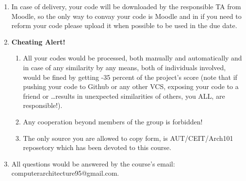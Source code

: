 \documentclass{report}
\begin{document}
\begin{enumerate}
	\item
		In case of delivery, your code will be downloaded by the responsible TA from Moodle, so the only way to convay your code is Moodle and in if you need to reform your code please upload it when possible to be used in the due date.
	\item
		\textbf{Cheating Alert!}
		\begin{enumerate}
			\item
				All your codes would be processed, both manually and automatically and in case of any similarity by any means, both of individuals involved, would be fined by getting -35 percent of the project's score (note that if pushing your code to Github or any other VCS, exposing your code to a friend or \ldots results in unexpected similarities of others, you ALL, are responsible!).
			\item
				Any cooperation beyond members of the group is forbidden!
			\item
				The only source you are allowed to copy form, is AUT/CEIT/Arch101 reposetory which has been devoted to this course.
		\end{enumerate}
	\item All questions would be answered by the course's email: computerarchitecture95@gmail.com.
\end{enumerate}
\end{document}
